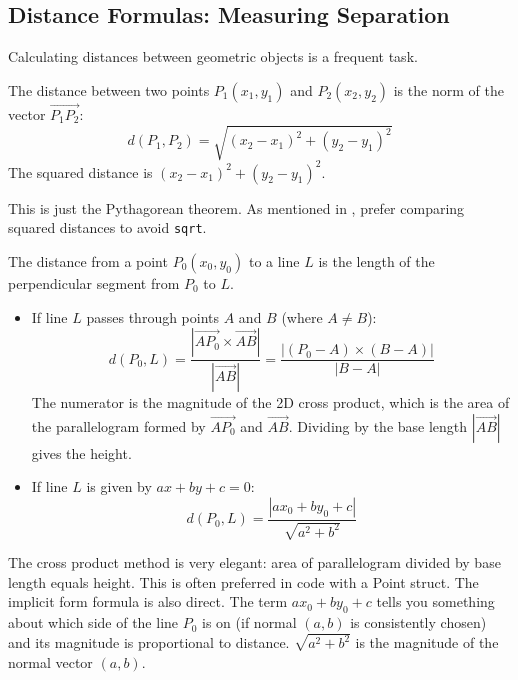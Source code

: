 \subsection{Distance Formulas: Measuring Separation}
\label{ssec:A.1.3}

Calculating distances between geometric objects is a frequent task.

\begin{definition}
\label{def:A.1.3.point_point_dist}
The distance between two points $P_1(x_1, y_1)$ and $P_2(x_2, y_2)$ is the norm of the vector $\vec{P_1P_2}$:
$$ d(P_1, P_2) = \sqrt{(x_2-x_1)^2 + (y_2-y_1)^2} $$
The squared distance is $(x_2-x_1)^2 + (y_2-y_1)^2$.
\end{definition}

\begin{intuition}
\label{intuition:A.1.3.point_point_dist}
This is just the Pythagorean theorem. As mentioned in , prefer comparing squared distances to avoid \texttt{sqrt}.
\end{intuition}

\begin{definition}
\label{def:A.1.3.point_line_dist}
The distance from a point $P_0(x_0, y_0)$ to a line $L$ is the length of the perpendicular segment from $P_0$ to $L$.
\begin{itemize}
    \item If line $L$ passes through points $A$ and $B$ (where $A \neq B$):
    $$ d(P_0, L) = \frac{|\vec{AP_0} \times \vec{AB}|}{|\vec{AB}|} = \frac{|(P_0-A) \times (B-A)|}{|B-A|} $$
    The numerator is the magnitude of the 2D cross product, which is the area of the parallelogram formed by $\vec{AP_0}$ and $\vec{AB}$. Dividing by the base length $|\vec{AB}|$ gives the height.
    \item If line $L$ is given by $ax+by+c=0$:
    $$ d(P_0, L) = \frac{|ax_0 + by_0 + c|}{\sqrt{a^2+b^2}} $$
\end{itemize}
\end{definition}

\begin{intuition}
\label{intuition:A.1.3.point_line_dist}
The cross product method is very elegant: area of parallelogram divided by base length equals height. This is often preferred in code with a Point struct.
The implicit form formula is also direct. The term $ax_0+by_0+c$ tells you something about which side of the line $P_0$ is on (if normal $(a,b)$ is consistently chosen) and its magnitude is proportional to distance. $\sqrt{a^2+b^2}$ is the magnitude of the normal vector $(a,b)$.
\end{intuition}

